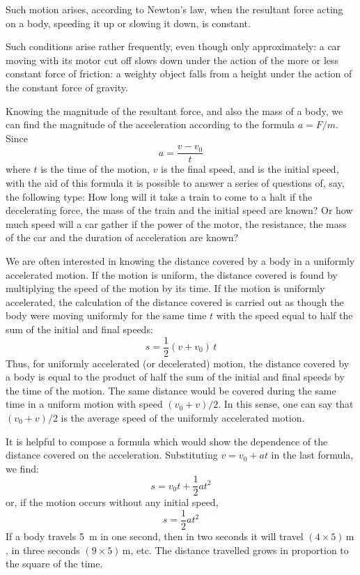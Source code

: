 Such motion arises, according to Newton's law, when
the resultant force acting on a body, speeding it up or
slowing it down, is constant.

Such conditions arise rather frequently, even though
only approximately: a car moving with its motor cut off
slows down under the action of the more or less constant
force of friction: a weighty object falls from a height
under the action of the constant force of gravity.

Knowing the magnitude of the resultant force, and
also the mass of a body, we can find the magnitude of the
acceleration according to the formula $a = F/m$. Since
\begin{equation*}
a= \frac{v - v_{0}}{t}
\end{equation*}
where $t$ is the time of the motion, $v$ is the final speed, and
is the initial speed, with the aid of this formula it is
possible to answer a series of questions of, say, the following type: How long will it take a train to come to a halt if the decelerating force, the mass of the train and the initial speed are known? Or how much speed will a car gather if the power of the motor, the resistance, the mass of the car and the duration of acceleration are known?

We are often interested in knowing the distance covered by a body in a uniformly accelerated motion. If the motion is uniform, the distance covered is found by multiplying the speed of the motion by its time. If the motion is uniformly accelerated, the calculation of the distance covered is carried out as though the body were moving uniformly for the same time $t$ with the speed equal to half the sum of the initial and final speeds:
\begin{equation*}
s = \frac{1}{2} (v + v_{0}) \, t
\end{equation*}
Thus, for uniformly accelerated (or decelerated) motion,
the distance covered by a body is equal to the product
of half the sum of the initial and final speeds by the time
of the motion. The same distance would be covered during
the same time in a uniform motion with speed $(v_{0}+v)/2$. In this sense, one can say that $(v_{0}+v)/2$ is the average speed of the uniformly accelerated motion.

It is helpful to compose a formula which would show the dependence of the distance covered on the acceleration. Substituting $v = v_{0}
+ at$ in the last formula, we find:
\begin{equation*}
s = v_{0}t + \frac{1}{2} a t^{2}
\end{equation*}
or, if the motion occurs without any initial speed,
\begin{equation*}
s = \frac{1}{2} a t^{2}
\end{equation*}
If a body travels \SI{5}{\meter} in one second, then in two seconds it will travel $(4 \times 5) \, \si{\meter}$, in three seconds $(9 \times 5) \, \si{\meter}$, etc. The distance travelled grows in proportion to the
square of the time.

